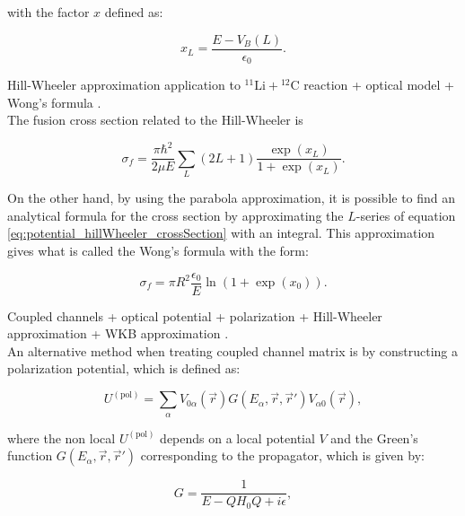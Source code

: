 \documentclass[openany]{book}
\begin{document}
with the factor $x$ defined as: 

\begin{equation}\label{eq:potential_hillWheeler_x}
	x_L = \frac{E - V_B(L)}{\epsilon_0}.
\end{equation}

Hill-Wheeler approximation  application to $\mathrm{{}^{11}Li + {}^{12}C}$ reaction + optical model + Wong's formula  \cite{esbensen_2012}. \\
 
The fusion cross section related to the Hill-Wheeler is 

\begin{equation}\label{eq:potential_hillWheeler_crossSection}
	\sigma_f = \frac{\pi \hbar^2}{2\mu E} \sum_{L} (2L + 1)   \frac{\exp(x_L)}{1 + \exp(x_L)}.
\end{equation}

On the other hand, by using the parabola approximation, it is possible to find an analytical formula for the cross section by approximating the $L$-series of equation \ref{eq:potential_hillWheeler_crossSection} with an integral. This approximation gives what is called the Wong's formula with the form:

\begin{equation}\label{eq:potential_wong}
	\sigma_f = \pi R^2 \frac{\epsilon_0}{E} \ln (1 + \exp (x_0)).
\end{equation}
 
Coupled channels + optical potential +  polarization +  Hill-Wheeler approximation  +  WKB approximation \cite{cardenas_canto_donangelo_hussein_lubian_romanelli_2002}. \\ 

An alternative method when treating coupled channel matrix is by constructing a polarization potential, which is defined as: 

\begin{equation}\label{eq:potential_polatization}
	U^{(\mathrm{pol})} = \sum_\alpha {V_{0\alpha} (\vec r) G(E_\alpha, \vec r, \vec r') V_{\alpha0} (\vec r)},
\end{equation}

where the non local $U^{(\mathrm{pol})} $  depends on a local potential $V$ and the Green's function $G(E_\alpha, \vec r, \vec r')$ corresponding to the propagator, which is given by:

\begin{equation}\label{eq:potential_propagator}
	G = \frac{1}{E - QH_0Q + i\epsilon},
\end{equation}
\end{document}
